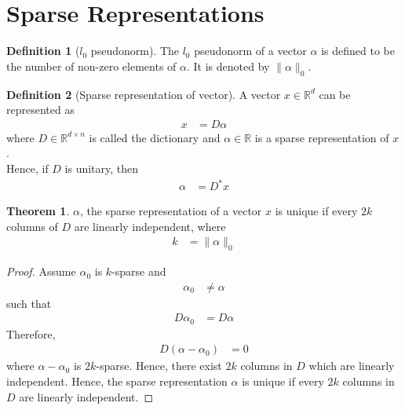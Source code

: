 \documentclass[titlepage, fleqn, a4paper, 12pt, twoside]{article}
\theoremstyle{definition}
\newtheorem{definition}{Definition}
\theoremstyle{theorem}
\newtheorem{theorem}{Theorem}
\begin{document}
\section{Sparse Representations}

\begin{definition}[$l_0$ pseudonorm]
	The $l_0$ pseudonorm of a vector $\alpha$ is defined to be the number of non-zero elements of $\alpha$.
	It is denoted by $\|\alpha\|_0$.
\end{definition}

\begin{definition}[Sparse representation of vector]
	A vector $x \in \mathbb{R}^d$ can be represented as
	\begin{align*}
		x &= D \alpha
	\end{align*}
	where $D \in \mathbb{R}^{d \times n}$ is called the dictionary and $\alpha \in \mathbb{R}$ is a sparse representation of $x$.\\
	Hence, if $D$ is unitary, then
	\begin{align*}
		\alpha &= D^* x
	\end{align*}
\end{definition}

\begin{theorem}
	$\alpha$, the sparse representation of a vector $x$ is unique if every $2 k$ columns of $D$ are linearly independent, where
	\begin{align*}
		k &= \|\alpha\|_0
	\end{align*}
\end{theorem}

\begin{proof}
	Assume $\alpha_0$ is $k$-sparse and
	\begin{align*}
		\alpha_0 &\neq \alpha
	\end{align*}
	such that
	\begin{align*}
		D \alpha_0 &= D \alpha
	\end{align*}
	Therefore,
	\begin{align*}
		D(\alpha - \alpha_0) &= 0
	\end{align*}
	where $\alpha - \alpha_0$ is $2 k$-sparse.
	Hence, there exist $2 k$ columns in $D$ which are linearly independent.
	Hence, the sparse representation $\alpha$ is unique if every $2 k$ columns in $D$ are linearly independent.
\end{proof}
\end{document}
